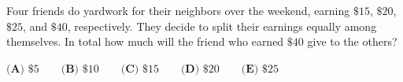Four friends do yardwork for their neighbors over the weekend, earning $\$15$, $\$20$, $\$25$, and $\$40$, respectively. They decide to split their earnings equally among themselves. In total how much will the friend who earned $\$40$ give to the others?

$\textbf{(A) }\$5 \qquad \textbf{(B) }\$10 \qquad \textbf{(C) }\$15 \qquad \textbf{(D) }\$20 \qquad \textbf{(E) }\$25$
